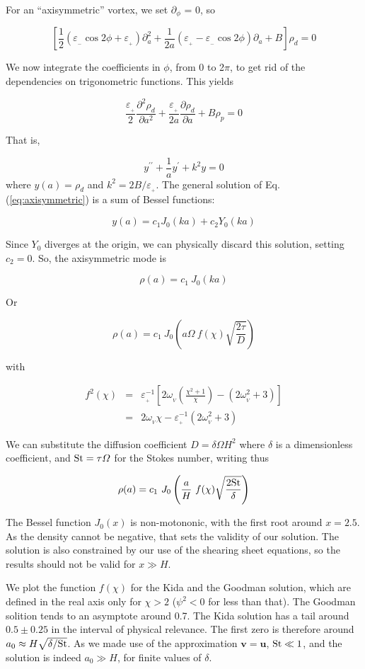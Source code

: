 \documentclass[useAMS,8pt,twocolumn]{article}
\newcommand{\pderiv}[2]{\frac{\partial #1}{\partial #2}}
\newcommand{\pderivn}[3]{\frac{\partial^{#3} #1}{\partial #2^{#3}}}
\renewcommand{\v}[1]{{\boldsymbol{#1}}} %
\newcommand{\Eq}[1]{Eq. (\ref{#1})}
\newcommand{\eq}[1]{\Eq{#1}}
\newcommand{\beq}{\begin{equation}}
\newcommand{\eeq}{\end{equation}}
\newcommand{\beqn}{\begin{eqnarray}}
\newcommand{\eeqn}{\end{eqnarray}}
\newcommand{\epsp}{\varepsilon_{_{+}}}
\newcommand{\epsm}{\varepsilon_{_{-}}}
\begin{document}
For an ``axisymmetric'' vortex, we set $\partial_\phi$ = 0, so 

\beq
\left[\frac{1}{2}\left( \epsm \cos 2\phi +\epsp\right) \partial^2_a   + \frac{1}{2a}\left( \epsp - \epsm\cos 2\phi\right) \partial_a  + B\right] \rho_d = 0 
\eeq

We now integrate the coefficients in $\phi$, from 0 to 2$\pi$, to get
rid of the dependencies on trigonometric functions. This yields

\beq
\frac{\epsp}{2}\pderivn{\rho_d}{a}{2} +
\frac{\epsp}{2a}\pderiv{\rho_d}{a} + B \rho_p = 0  
\eeq

That is, 

\beq
y^{\prime\prime} + \frac{1}{a}y^\prime + k^2 y = 0 
\label{eq:axisymmetric}
\eeq where $y(a) = \rho_d$ and $k^2 = 2B/\epsp$.  The general solution of \eq{eq:axisymmetric} is a
sum of Bessel functions: 

\beq
y(a) = c_1 J_0 (ka) + c_2 Y_0(ka) 
\eeq

Since  $Y_0$ diverges at the origin, we can physically discard 
this solution, setting $c_2=0$. So, the axisymmetric mode is

\beq\label{eq:axi}
\rho(a) = c_1 \ J_0 (ka)
\eeq

Or

\beq
\rho(a) = c_1 \ J_0 \left(a\varOmega \ f(\chi) \sqrt{\frac{2\tau}{D}} \right)
\eeq

\noindent with 

\beqn
f^2(\chi) &=& \epsp^{-1} \left[2\omega_{_V}\left(\frac{\chi^2+1}{\chi}\right) - (2\omega_{_V}^2 + 3) \right]\nonumber \\
          &=& 2\omega_{_V}\chi - \epsp^{-1}(2\omega_{_V}^2 + 3)
\eeqn

We can substitute the diffusion coefficient $D=\delta \varOmega H^2$ where 
$\delta$ is a dimensionless coefficient, and ${\rm St} = \tau\varOmega$ for 
the Stokes number, writing thus 

\beq
\rho(a) = c_1 \ J_0 \left(\frac{a}{H} \ f(\chi) \sqrt{\frac{2{\rm St}}{\delta}}\right)
\eeq 

The Bessel function $J_0(x)$ is
non-motononic, with the first root around $x=2.5$. As the density
cannot be negative, that sets the validity of our solution. The
solution is also constrained by our use of the shearing sheet
equations, so the results should not be valid for $x \gg H$. 
 
We plot the function $f(\chi)$ for the Kida and the Goodman
solution, which are defined in the real axis only for $\chi > 2$ ($\psi^2
< 0$ for less than that). The Goodman solition tends to an asymptote
around 0.7. The Kida solution has a  tail around $0.5\pm0.25$ in the
interval of physical relevance. The first zero is therefore around
$a_0 \approx H \sqrt{\delta/{\rm St}}$.  As we made use of the
approximation $\v{v}=\v{u}$, ${\rm St} \ll 1$, and the solution is indeed $a_0 \gg H$, for finite values of $\delta$.
\end{document}
